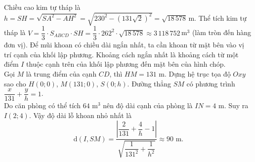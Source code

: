 \begin{ex}
{\begin{itemchoice}
			Chiều cao kim tự tháp là $h=SH = \sqrt{SA^2 - AH^2} = \sqrt{230^2 - \left(131\sqrt{2}\right)^2} = \sqrt{18\,578}\,$m.
			\itemch Thể tích kim tự tháp là $V = \dfrac{1}{3} \cdot S_{ABCD} \cdot SH = \dfrac{1}{3} \cdot 262^2 \cdot \sqrt{18\,578} \approx 3\,118\,752\,$m$^3$ (làm tròn đến hàng đơn vị).
			\itemch Để mũi khoan có chiều dài ngắn nhất, ta cần khoan từ mặt bên vào vị trí cạnh của khối lập phương. Khoảng cách ngắn nhất là khoảng cách từ một điểm $I$ thuộc cạnh trên của khối lập phương đến mặt bên của hình chóp.\\
			Gọi $M$ là trung điểm của cạnh $CD$, thì $HM=131$ m. Dựng hệ trục tọa độ $Oxy$ sao cho $H(0;0)$, $M(131;0)$, $S\left(0;h\right)$. Đường thẳng $SM$ có phương trình $\dfrac{x}{131}+\dfrac{y}{h}=1$.\\
			Do căn phòng có thể tích $64$ m$^3$ nên độ dài cạnh của phòng là $IN=4$ m. Suy ra $I(2;4)$. Vậy độ dài lỗ khoan nhỏ nhất là
			\[ \mathrm{d}(I,SM)=\dfrac{\left| \dfrac{2}{131}+\dfrac{4}{h}-1 \right|}{\sqrt{\dfrac{1}{131^2}+\dfrac{1}{h^2}}}\approx 90\text{ m}. \]
		\end{itemchoice}
	}
\end{ex}

